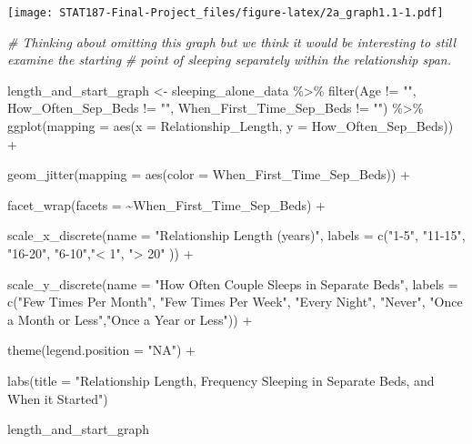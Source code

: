 \documentclass[
]{article}
\newenvironment{Shaded}{\begin{snugshade}}{\end{snugshade}}
\newcommand{\AttributeTok}[1]{\textcolor[rgb]{0.77,0.63,0.00}{#1}}
\newcommand{\CommentTok}[1]{\textcolor[rgb]{0.56,0.35,0.01}{\textit{#1}}}
\newcommand{\FunctionTok}[1]{\textcolor[rgb]{0.00,0.00,0.00}{#1}}
\newcommand{\NormalTok}[1]{#1}
\newcommand{\OtherTok}[1]{\textcolor[rgb]{0.56,0.35,0.01}{#1}}
\newcommand{\SpecialCharTok}[1]{\textcolor[rgb]{0.00,0.00,0.00}{#1}}
\newcommand{\StringTok}[1]{\textcolor[rgb]{0.31,0.60,0.02}{#1}}
\begin{document}
\texttt{[image: STAT187-Final-Project\_files/figure-latex/2a\_graph1.1-1.pdf]}

\begin{Shaded}
\begin{Highlighting}[]
\CommentTok{\# Thinking about omitting this graph but we think it would be interesting to still examine the starting }
\CommentTok{\# point of sleeping separately within the relationship span. }

\NormalTok{length\_and\_start\_graph }\OtherTok{\textless{}{-}}\NormalTok{ sleeping\_alone\_data }\SpecialCharTok{\%\textgreater{}\%}
  \FunctionTok{filter}\NormalTok{(Age }\SpecialCharTok{!=} \StringTok{""}\NormalTok{, How\_Often\_Sep\_Beds }\SpecialCharTok{!=} \StringTok{""}\NormalTok{, When\_First\_Time\_Sep\_Beds }\SpecialCharTok{!=} \StringTok{""}\NormalTok{) }\SpecialCharTok{\%\textgreater{}\%}
  \FunctionTok{ggplot}\NormalTok{(}\AttributeTok{mapping =} \FunctionTok{aes}\NormalTok{(}\AttributeTok{x =}\NormalTok{ Relationship\_Length,}
                      \AttributeTok{y =}\NormalTok{ How\_Often\_Sep\_Beds)) }\SpecialCharTok{+}

  \FunctionTok{geom\_jitter}\NormalTok{(}\AttributeTok{mapping =} \FunctionTok{aes}\NormalTok{(}\AttributeTok{color =}\NormalTok{ When\_First\_Time\_Sep\_Beds)) }\SpecialCharTok{+}

  \FunctionTok{facet\_wrap}\NormalTok{(}\AttributeTok{facets =} \SpecialCharTok{\textasciitilde{}}\NormalTok{When\_First\_Time\_Sep\_Beds) }\SpecialCharTok{+}

  \FunctionTok{scale\_x\_discrete}\NormalTok{(}\AttributeTok{name =} \StringTok{"Relationship Length (years)"}\NormalTok{, }\AttributeTok{labels =} \FunctionTok{c}\NormalTok{(}\StringTok{"1{-}5"}\NormalTok{, }\StringTok{"11{-}15"}\NormalTok{, }\StringTok{"16{-}20"}\NormalTok{, }\StringTok{"6{-}10"}\NormalTok{,}\StringTok{"\textless{} 1"}\NormalTok{, }\StringTok{"\textgreater{} 20"}\NormalTok{ )) }\SpecialCharTok{+}

  \FunctionTok{scale\_y\_discrete}\NormalTok{(}\AttributeTok{name =} \StringTok{"How Often Couple Sleeps in Separate Beds"}\NormalTok{, }\AttributeTok{labels =} \FunctionTok{c}\NormalTok{(}\StringTok{"Few Times Per Month"}\NormalTok{, }\StringTok{"Few Times Per Week"}\NormalTok{, }\StringTok{"Every Night"}\NormalTok{, }\StringTok{"Never"}\NormalTok{, }\StringTok{"Once a Month or Less"}\NormalTok{,}\StringTok{"Once a Year or Less"}\NormalTok{)) }\SpecialCharTok{+}

  \FunctionTok{theme}\NormalTok{(}\AttributeTok{legend.position =} \StringTok{"NA"}\NormalTok{) }\SpecialCharTok{+}

  \FunctionTok{labs}\NormalTok{(}\AttributeTok{title =} \StringTok{"Relationship Length, Frequency Sleeping in Separate Beds, and When it Started"}\NormalTok{)}

\NormalTok{length\_and\_start\_graph}
\end{Highlighting}
\end{Shaded}
\end{document}
